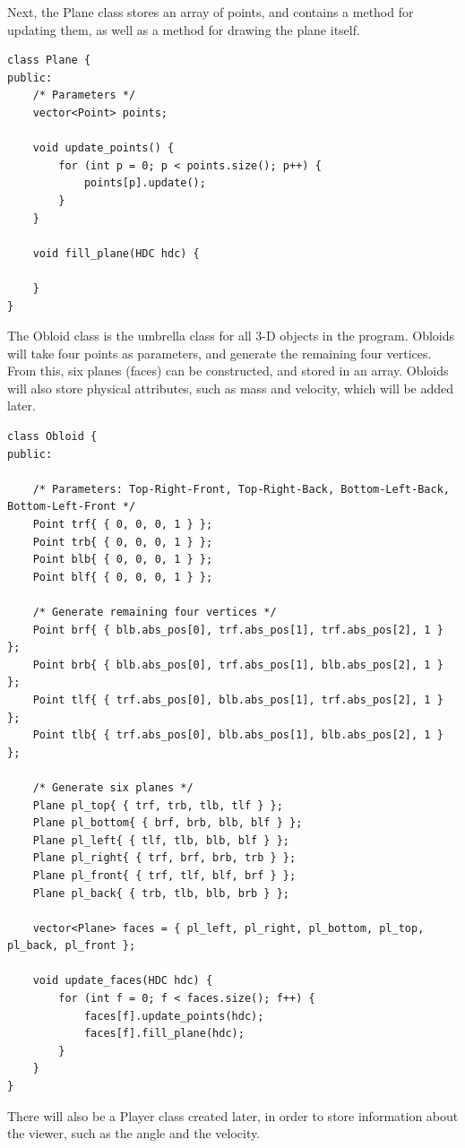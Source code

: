 \documentclass{article}
\begin{document}
Next, the Plane class stores an array of points, and contains a method for updating them, as well as a method for drawing the plane itself. 
\begin{lstlisting}
class Plane {
public:
	/* Parameters */
	vector<Point> points;
	
	void update_points() {
		for (int p = 0; p < points.size(); p++) {
			points[p].update();
		}
	}
	
	void fill_plane(HDC hdc) {
	
	}
}
\end{lstlisting}
\newpage
The Obloid class is the umbrella class for all 3-D objects in the program. Obloids will take four points as parameters, and generate the remaining four vertices. From this, six planes (faces) can be constructed, and stored in an array. 
\newline
\newline
Obloids will also store physical attributes, such as mass and velocity, which will be added later.

\begin{lstlisting}
class Obloid {
public:

	/* Parameters: Top-Right-Front, Top-Right-Back, Bottom-Left-Back, Bottom-Left-Front */
	Point trf{ { 0, 0, 0, 1 } };
	Point trb{ { 0, 0, 0, 1 } };
	Point blb{ { 0, 0, 0, 1 } };
	Point blf{ { 0, 0, 0, 1 } };
	
	/* Generate remaining four vertices */
	Point brf{ { blb.abs_pos[0], trf.abs_pos[1], trf.abs_pos[2], 1 } };
	Point brb{ { blb.abs_pos[0], trf.abs_pos[1], blb.abs_pos[2], 1 } };
	Point tlf{ { trf.abs_pos[0], blb.abs_pos[1], trf.abs_pos[2], 1 } };
	Point tlb{ { trf.abs_pos[0], blb.abs_pos[1], blb.abs_pos[2], 1 } };
	
	/* Generate six planes */	
	Plane pl_top{ { trf, trb, tlb, tlf } };
	Plane pl_bottom{ { brf, brb, blb, blf } };
	Plane pl_left{ { tlf, tlb, blb, blf } };
	Plane pl_right{ { trf, brf, brb, trb } };
	Plane pl_front{ { trf, tlf, blf, brf } };
	Plane pl_back{ { trb, tlb, blb, brb } };
	
	vector<Plane> faces = { pl_left, pl_right, pl_bottom, pl_top, pl_back, pl_front };
	
	void update_faces(HDC hdc) {
		for (int f = 0; f < faces.size(); f++) {
			faces[f].update_points(hdc);
			faces[f].fill_plane(hdc);
		}
	}
}
\end{lstlisting}

There will also be a Player class created later, in order to store information about the viewer, such as the angle and the velocity. 
\newpage
\end{document}
